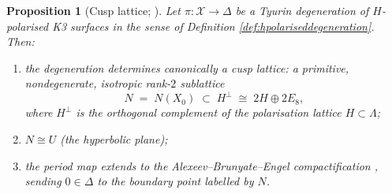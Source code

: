\documentclass[11pt]{amsart}
\theoremstyle{plain}
\newtheorem{proposition}[theorem]{Proposition}
\theoremstyle{definition}
\newcommand{\Lam}{\Lambda}
\newcommand{\cX}{\mathcal{X}}
\begin{document}
\begin{proposition}[{Cusp lattice; \cite{Fri83,dfk3slpms}}]\label{prop:cusplattice}
Let $\pi\colon\cX\to\Delta$ be a Tyurin degeneration of $H$-polarised K3
surfaces in the sense of Definition \ref{def:hpolariseddegeneration}. Then:
\begin{enumerate}
  \item[(i)] the degeneration determines canonically a \emph{cusp lattice}: a
  primitive, nondegenerate, isotropic rank-$2$ sublattice
  \[
  N\;=\;N(X_0)\;\subset\; H^\perp\;\cong\;2H\oplus 2E_8,
  \]
  where $H^\perp$ is the orthogonal complement of the polarisation lattice
  $H\subset\Lam$;
  \item[(ii)] $N\cong U$ (the hyperbolic plane);
  \item[(iii)] the period map extends to the Alexeev--Brunyate--Engel
  compactification \cite{cmek3sspt}, sending $0\in\Delta$ to the boundary point
  labelled by $N$.
\end{enumerate}
\end{proposition}
\end{document}
